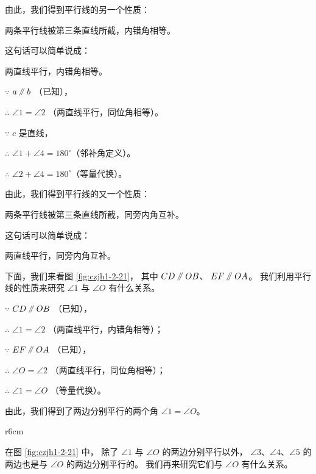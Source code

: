 由此，我们得到平行线的另一个性质：

\begin{xingzhi}
    两条平行线被第三条直线所截，内错角相等。
\end{xingzhi}

这句话可以简单说成：\begin{xingzhi}
    两直线平行，内错角相等。
\end{xingzhi}

$\because$ \quad $a \pingxing b$ （已知），

$\therefore$ \quad $\angle 1 = \angle 2$ （两直线平行，同位角相等）。

$\because$ \quad $c$ 是直线，

$\therefore$ \quad $\angle 1 + \angle 4 = 180^\circ$（邻补角定义）。

$\therefore$ \quad $\angle 2 + \angle 4 = 180^\circ$（等量代换）。

由此，我们得到平行线的又一个性质：

\begin{xingzhi}
    两条平行线被第三条直线所截，同旁内角互补。
\end{xingzhi}

这句话可以简单说成：\begin{xingzhi}
    两直线平行，同旁内角互补。
\end{xingzhi}

下面，我们来看图 \ref{fig:czjh1-2-21}， 其中 $CD \pingxing OB$、 $EF \pingxing OA$。
我们利用平行线的性质来研究 $\angle 1$ 与 $\angle O$ 有什么关系。

$\because$ \quad $CD \pingxing OB$ （已知），

$\therefore$ \quad $\angle 1 = \angle 2$ （两直线平行，内错角相等）；

$\because$ \quad $EF \pingxing OA$ （已知），

$\therefore$ \quad $\angle O = \angle 2$ （两直线平行，同位角相等）；

$\therefore$ \quad $\angle 1 = \angle O$ （等量代换）。

由此，我们得到了两边分别平行的两个角 $\angle 1 = \angle O$。


\begin{wrapfigure}[8]{r}{6cm}
    \centering
    
    \caption{}\label{fig:czjh1-2-21}
\end{wrapfigure}

在图 \ref{fig:czjh1-2-21} 中， 除了 $\angle 1$ 与 $\angle O$ 的两边分别平行以外，
$\angle 3$、$\angle 4$、$\angle 5$ 的两边也是与 $\angle O$ 的两边分别平行的。
我们再来研究它们与 $\angle O$ 有什么关系。


